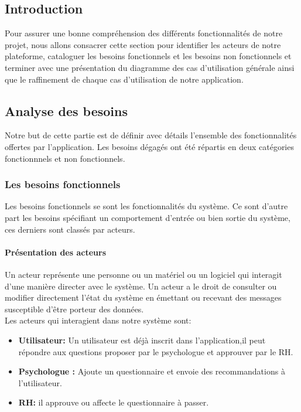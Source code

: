 \documentclass[12]{article}
\begin{document}
\subsection{Introduction}
Pour assurer une bonne compréhension des différents fonctionnalités de notre projet, nous allons consacrer cette section pour identifier les acteurs de notre plateforme, cataloguer les besoins fonctionnels et les besoins non fonctionnels et terminer avec une présentation du diagramme des cas d'utilisation générale ainsi que le raffinement de chaque cas d'utilisation de notre application.

\subsection{Analyse des besoins}

 Notre but de cette partie est de définir avec détails l'ensemble des fonctionnalités offertes par l'application. Les besoins dégagés ont été répartis en deux catégories fonctionnnels et non fonctionnels.
 \subsubsection{Les besoins fonctionnels}
 
 Les besoins fonctionnels se sont les fonctionnalités du système. Ce sont d'autre part les besoins spécifiant un comportement d'entrée ou bien sortie du système, ces derniers sont classés par acteurs.
 
 \paragraph{Présentation des acteurs\\}
 
 Un acteur représente une personne ou un matériel ou un logiciel qui interagit d'une manière directer avec le système. Un acteur a le droit de consulter ou modifier directement l'état du système en émettant ou recevant des messages susceptible d'être porteur des données.\\
 
 Les acteurs qui interagient dans notre système sont:\\
 
 \begin{itemize}
 \item \textbf{Utilisateur:} Un utilisateur est déjà inscrit dans l'application,il peut répondre aux questions proposer par le psychologue et approuver par le RH.
 \item \textbf{Psychologue :} Ajoute un questionnaire et envoie des recommandations à l'utilisateur.
 \item \textbf{RH:} il approuve ou affecte le questionnaire à passer.
 \end{itemize}
 
\end{document}
